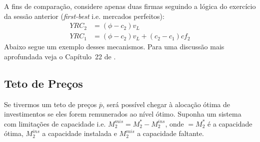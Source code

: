 A fins de comparação, considere apenas duas firmas seguindo a lógica do exercício da sessão anterior (\textit{first-best} i.e. mercados perfeitos):
\begin{align*}
    YRC_2&=(\phi-c_2)v_L\\
    YRC_1&=(\phi-c_2)v_L+(c_2-c_1)cf_2
\end{align*}
Abaixo segue um exemplo desses mecanismos. Para uma discussão mais aprofundada veja o Capítulo~22 de \textcite{cretì_fontini_2019}.

\subsection{Teto de Preços}
Se tivermos um teto de preços $\overline{p}$, será possível chegar à alocação ótima de investimentos se eles forem remunerados ao nível ótimo. Suponha um sistema com limitações de capacidade i.e. $M_2^{mis}=M_2^*-M_2^{ins}$, onde $=M_2^*$ é a capacidade ótima, $M_2^{ins}$ a capacidade instalada e $M_2^{mis}$ a capacidade faltante. 


